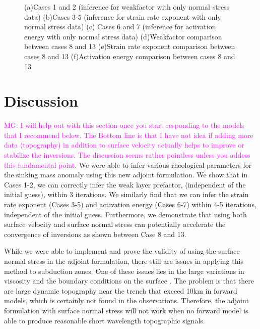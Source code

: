 \documentclass[12pt]{article}
\newcommand{\mgnote}[1]{\textcolor{magenta}{MG: #1}}
\begin{document}
\begin{figure}[H]
{}
\hspace{-0.1cm}
\caption{(a)Cases 1 and 2 (inference for weakfactor with only normal stress data) (b)Cases 3-5 (inference for strain rate exponent with only normal stress data) (c) Cases 6 and 7 (inference for activation energy with only normal stress data) (d)Weakfactor comparison between cases 8 and 13 (e)Strain rate exponent comparison between cases 8 and 13 (f)Activation energy comparison between cases 8 and 13 }
\label{fig:topog_converge}
\end{figure}







	




\section*{Discussion}

\mgnote{I will help out with this section once you start responding to the models that I recommend below. The Bottom line is that I have not idea if adding more data (topography) in addition to surface velocity actually helps to improve or stabilize the inversions. The discussion seems rather pointless unless you addess this fundamental point.}
We were able to infer various rheological parameters for the sinking mass anomaly using this new adjoint formulation. We show that in Cases 1-2, we can correctly infer the weak layer prefactor, (independent of the initial guess), within 3 iterations. We similarly find that we can infer the strain rate exponent (Cases 3-5) and activation energy (Cases 6-7) within 4-5 iterations, independent of the initial guess.  Furthermore, we demonstrate that using both surface velocity and surface normal stress can potentially accelerate the convergence of inversions as shown between Case 8 and 13.

 While we were able to implement and prove the validity of using the surface normal stress in the adjoint formulation, there still are issues in applying this method to subduction zones. One of these issues lies in the large variations in viscosity and the boundary conditions on the surface \citep{crameri2017dynamical}. The problem is that there are large dynamic topography near the trench that exceed 10km in forward models, which is certainly not found in the observations. Therefore, the adjoint formulation with surface normal stress will not work when no forward model is able to produce reasonable short wavelength topographic signals. 
 
\end{document}
